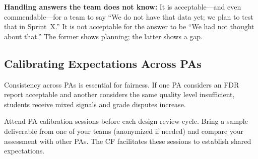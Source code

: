 \textbf{Handling answers the team does not know:} It is acceptable---and even commendable---for a team to say ``We do not have that data yet; we plan to test that in Sprint~X.'' It is not acceptable for the answer to be ``We had not thought about that.'' The former shows planning; the latter shows a gap.

\subsection{Calibrating Expectations Across PAs}

Consistency across PAs is essential for fairness. If one PA considers an FDR report acceptable and another considers the same quality level insufficient, students receive mixed signals and grade disputes increase.

\begin{paaction}
Attend PA calibration sessions before each design review cycle. Bring a sample deliverable from one of your teams (anonymized if needed) and compare your assessment with other PAs. The CF facilitates these sessions to establish shared expectations.
\end{paaction}


